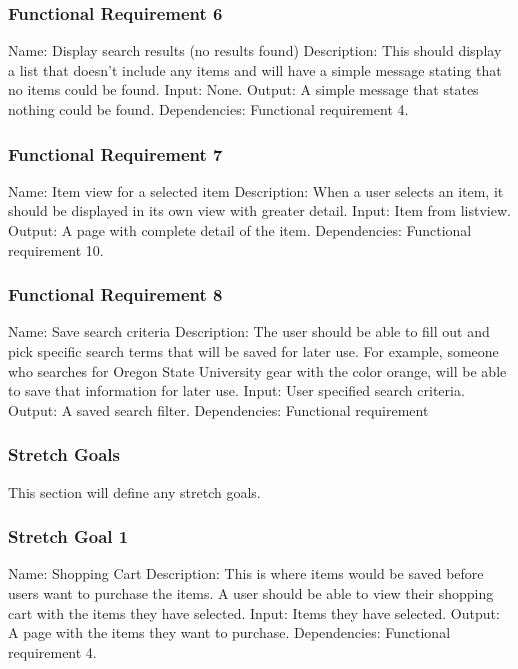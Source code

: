 \documentclass[journal,compsoc, 10pt, draftclsnofoot, onecolumn]{IEEEtran}
\begin{document}
\subsubsection*{Functional Requirement 6}
Name: Display search results (no results found)\newline
Description: This should display a list that doesn't include any items and will 
have a simple message stating that no items could be found. \newline
Input: None.\newline
Output: A simple message that states nothing could be found.\newline
Dependencies: Functional requirement 4.

\subsubsection*{Functional Requirement 7}
Name: Item view for a selected item\newline
Description: When a user selects an item, it should be displayed in its own view
 with greater detail.\newline
Input: Item from listview.\newline
Output: A page with complete detail of the item.\newline
Dependencies: Functional requirement 10.

\subsubsection*{Functional Requirement 8}
Name: Save search criteria\newline
Description: The user should be able to fill out and pick specific search terms
that will be saved for later use. For example, someone who searches for Oregon 
State University gear with the color orange, will be able to save that information
for later use.\newline
Input: User specified search criteria.\newline
Output: A saved search filter.\newline
Dependencies: Functional requirement 

\subsubsection{Stretch Goals}

This section will define any stretch goals.

\subsubsection*{Stretch Goal 1}
Name: Shopping Cart\newline
Description: This is where items would be saved before users want to
purchase the items. A user should be able to view their shopping cart with
the items they have selected.\newline
Input: Items they have selected.\newline
Output: A page with the items they want to purchase.\newline
Dependencies: Functional requirement 4.
\end{document}
